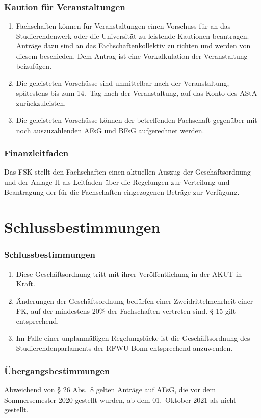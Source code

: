 \documentclass{article}
\begin{document}
\section{Kaution für Veranstaltungen}
\begin{enumerate}[(1)]
    \item Fachschaften können für Veranstaltungen einen Vorschuss für an das Studierendenwerk oder die Universität zu leistende Kautionen beantragen. 
    	Anträge dazu sind an das Fachschaftenkollektiv zu richten und werden von diesem beschieden. 
    	Dem Antrag ist eine Vorkalkulation der Veranstaltung beizufügen.
    \item Die geleisteten Vorschüsse sind unmittelbar nach der Veranstaltung, spätestens bis zum 14.\ Tag nach der Veranstaltung, auf das Konto des AStA zurückzuleisten.
    \item Die geleisteten Vorschüsse können der betreffenden Fachschaft gegenüber mit noch auszuzahlenden AFsG und BFsG aufgerechnet werden.
\end{enumerate}

\section{Finanzleitfaden}
Das FSK stellt den Fachschaften einen aktuellen Auszug der Geschäftsordnung und der Anlage II als Leitfaden über die Regelungen zur Verteilung und Beantragung der für die Fachschaften eingezogenen Beträge zur Verfügung.

\part{Schlussbestimmungen}
\section{Schlussbestimmungen}
\begin{enumerate}[(1)]
    \item Diese Geschäftsordnung tritt mit ihrer Veröffentlichung in der AKUT in Kraft.
    \item Änderungen der Geschäftsordnung bedürfen einer Zweidrittelmehrheit einer FK, auf der mindestens 20\% der Fachschaften vertreten sind. 
    	§ 15 gilt entsprechend.
    \item Im Falle einer unplanmäßigen Regelungslücke ist die Geschäftsordnung des Studierendenparlaments der RFWU Bonn entsprechend anzuwenden.   
\end{enumerate}

\section{Übergangsbestimmungen}
Abweichend von § 26 Abs.\ 8 gelten Anträge auf AFsG, die vor dem Sommersemester 2020 gestellt wurden, ab dem 01.\ Oktober 2021 als nicht gestellt.
\end{document}
